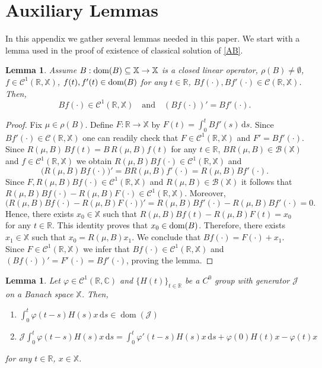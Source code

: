 \documentclass[11pt]{amsart}
\numberwithin{equation}{section}
\newcommand{\RR}{{\mathbb R}}
\newcommand{\rmd}{{\mathrm{d}}}
\newtheorem{lemma}[theorem]{Lemma}
\theoremstyle{remark}
\theoremstyle{definition}
\newcommand\bX{{\mathbb X}}
\newcommand{\dom}{\text{\rm{dom}}}
\begin{document}
\section{Auxiliary Lemmas}\label{A1}
In this appendix we gather several lemmas needed in this paper. We start with a lemma used in the proof of existence of classical solution of \eqref{AB}.
\begin{lemma}\label{App1}
	Assume $B : \dom(B) \subseteq\bX \to\bX$ is a closed linear operator, $\rho(B) \neq \emptyset$,
	$f \in \mathcal{C}^1(\mathbb{R}, \bX)$, $f(t), f'(t) \in \dom(B)$ for any $t \in \mathbb{R}$, $Bf(\cdot), Bf'(\cdot) \in \mathcal{C}(\mathbb{R},\bX)$.
	Then,
	\begin{equation}\label{App1.1}
		Bf(\cdot) \in \mathcal{C}^1(\mathbb{R},\bX) \quad \text{and} \quad (Bf(\cdot))' = Bf'(\cdot). 
	\end{equation}
\end{lemma}
\begin{proof}
	Fix $\mu \in \rho(B)$. Define $F : \mathbb{R} \to\bX$ by
	$F(t) = \int_0^t Bf'(s)\,\rmd s$.
	Since $Bf'(\cdot) \in \mathcal{C}(\mathbb{R},\bX)$ one can readily check that $F \in \mathcal{C}^1(\mathbb{R},\bX)$ and $F' = Bf'(\cdot)$. Since $R(\mu, B)\,Bf(t) = B\,R(\mu,B)f(t)$ for any $t\in\RR$, $BR(\mu,B) \in \mathcal{B}(\bX)$ and $f \in \mathcal{C}^1(\mathbb{R},\bX)$ we obtain $R(\mu,B)Bf(\cdot) \in \mathcal{C}^1(\mathbb{R},\bX)$
	and
	\begin{equation}\label{App1.2}
		\bigl(R(\mu,B)Bf(\cdot)\bigr)' = BR(\mu,B)f'(\cdot) = R(\mu,B)Bf'(\cdot). 
	\end{equation}
	Since $F, R(\mu,B)Bf(\cdot) \in \mathcal{C}^1(\mathbb{R},\bX)$ and $R(\mu,B) \in \mathcal{B}(\bX)$
	it follows that $R(\mu,B)Bf(\cdot) - R(\mu,B)F(\cdot) \in \mathcal{C}^1(\mathbb{R},\bX)$. Moreover, 
	\begin{equation}\label{App1.3}
		\bigl(R(\mu,B)Bf(\cdot) - R(\mu,B)F(\cdot)\bigr)' = R(\mu,B)Bf'(\cdot) - R(\mu,B)Bf'(\cdot) = 0. 
	\end{equation}
	Hence, there exists $x_0 \in\bX$ such that
	$R(\mu,B)Bf(t) - R(\mu,B)F(t) = x_0$ for any $t \in \mathbb{R}$. This identity proves that $x_0\in\dom(B)$. Therefore, there exists $x_1 \in\bX$ such that
	$x_0 = R(\mu, B)x_1$. We conclude that $Bf(\cdot) = F(\cdot) + x_1$. Since $F\in\mathcal{C}^1(\mathbb{R},\bX)$ we infer that $ Bf(\cdot) \in \mathcal{C}^1(\mathbb{R},\bX)$
	and $(Bf(\cdot))' = F'(\cdot) = Bf'(\cdot)$, proving the lemma.
\end{proof}
\begin{lemma}\label{App2}
	Let $\varphi \in \mathcal{C}^1(\mathbb{R}, \mathbb{C})$ and $\{H(t)\}_{t \in \mathbb{R}}$ be a $C^0$ group with generator $\mathcal{J}$ on a Banach space $\bX$. Then,
	\begin{enumerate}
		\item[(i)] $\displaystyle \int_0^t \varphi(t-s) H(s) x\, \rmd s \in \operatorname{dom}(\mathcal{J})$
		\item[(ii)] $\displaystyle \mathcal{J} \int_0^t \varphi(t-s) H(s) x\, \rmd s = \int_0^t \varphi'(t-s) H(s) x\, \rmd s + \varphi(0) H(t) x - \varphi(t) x$
	\end{enumerate}
	for any $t \in \mathbb{R}$, $x \in \bX$.
\end{lemma}
\end{document}
